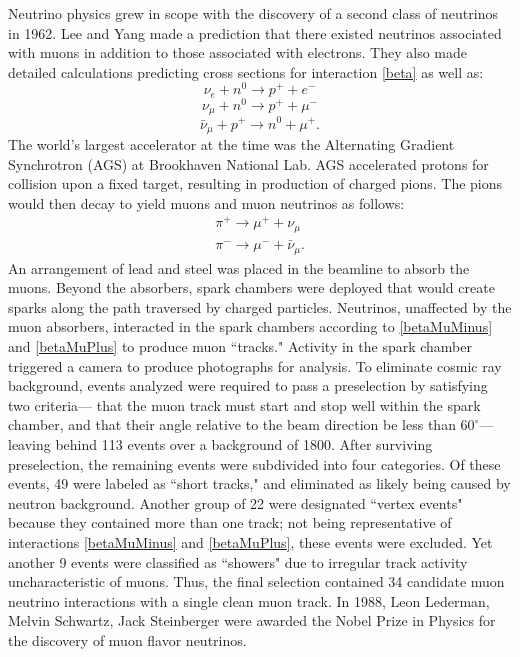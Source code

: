 Neutrino physics grew in scope  with the discovery of a second class of neutrinos in 1962.  Lee and Yang made a prediction that there existed neutrinos associated with muons in addition to those associated with electrons.  They also made detailed calculations predicting cross sections for interaction \eqref{beta} as well as:
\begin{equation} \label{betaMinus} \nu_e + n^0 \rightarrow p^+ + e^- \end{equation}
\begin{equation} \label{betaMuMinus}\nu_\mu + n^0 \rightarrow  p^+ + \mu^- \end{equation}
\begin{equation} \label{betaMuPlus}\bar{\nu}_\mu + p^+ \rightarrow n^0 + \mu^+ . \end{equation}
The world's largest accelerator at the time was the Alternating Gradient Synchrotron (AGS) at Brookhaven National Lab.  AGS accelerated protons for collision upon a fixed target, resulting in production of charged pions.  The pions would then decay to yield muons and muon neutrinos as follows:  
\begin{equation} \label{pions} \begin{split}
\pi^+ \rightarrow \mu^+ + \nu_\mu {\ } \\
\pi^- \rightarrow \mu^- + \bar{\nu}_\mu.
\end{split} \end{equation}
An arrangement of lead and steel was placed in the beamline to absorb the muons.  Beyond the absorbers, spark chambers were deployed that would create sparks along the path traversed by charged particles.  Neutrinos, unaffected by the muon absorbers, interacted in the spark chambers according to \eqref{betaMuMinus} and \eqref{betaMuPlus} to produce muon ``tracks."  Activity in the spark chamber triggered a camera to produce photographs for analysis.  To eliminate cosmic ray background, events analyzed were required to pass a preselection by satisfying two criteria--- that the muon track must start and stop well within the spark chamber, and that their angle relative to the beam direction be less than $60^\circ$--- leaving behind 113 events over a background of 1800.  After surviving preselection, the remaining events were subdivided into four categories.  Of these events, 49 were labeled as ``short tracks," and eliminated as likely being caused by neutron background.  Another group of 22 were designated ``vertex events"  because they contained more than one track; not being representative of interactions \eqref{betaMuMinus} and \eqref{betaMuPlus}, these events were excluded.  Yet another 9 events were classified as ``showers" due to irregular track activity uncharacteristic of muons.  Thus, the final selection contained 34 candidate muon neutrino interactions with a single clean muon track.\cite{numuDiscovery}  In 1988, Leon Lederman, Melvin Schwartz, Jack Steinberger were awarded the Nobel Prize in Physics for the discovery of muon flavor neutrinos. 

